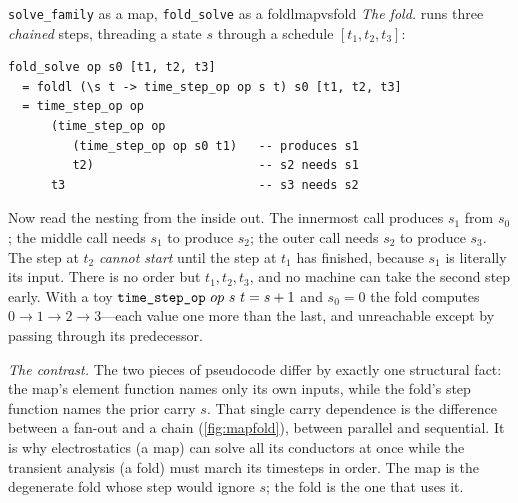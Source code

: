 \begin{workedexample}{\texttt{solve\_family} as a map, \texttt{fold\_solve} as a foldl}{mapvsfold}
\emph{The fold.}  runs three \emph{chained} steps, threading a
state $s$ through a schedule $[t_1, t_2, t_3]$:
\begin{lstlisting}[style=l4style]
fold_solve op s0 [t1, t2, t3]
  = foldl (\s t -> time_step_op op s t) s0 [t1, t2, t3]
  = time_step_op op
      (time_step_op op
         (time_step_op op s0 t1)   -- produces s1
         t2)                       -- s2 needs s1
      t3                           -- s3 needs s2
\end{lstlisting}
Now read the nesting from the inside out. The innermost call produces $s_1$ from
$s_0$; the middle call needs $s_1$ to produce $s_2$; the outer call needs $s_2$ to
produce $s_3$. The step at $t_2$ \emph{cannot start} until the step at $t_1$ has
finished, because $s_1$ is literally its input. There is no order but
$t_1, t_2, t_3$, and no machine can take the second step early. With a toy
$\texttt{time\_step\_op}\ op\ s\ t = s + 1$ and $s_0 = 0$ the fold computes
$0 \to 1 \to 2 \to 3$---each value one more than the last, and unreachable except
by passing through its predecessor.

\emph{The contrast.} The two pieces of pseudocode differ by exactly one structural
fact: the map's element function names only its own inputs, while the fold's step
function names the prior carry $s$. That single carry dependence is the difference
between a fan-out and a chain (\cref{fig:mapfold}), between parallel and
sequential. It is why electrostatics (a  map) can solve all its
conductors at once while the transient analysis (a  fold) must
march its timesteps in order. The map is the degenerate fold whose step would
ignore $s$; the fold is the one that uses it.
\end{workedexample}

